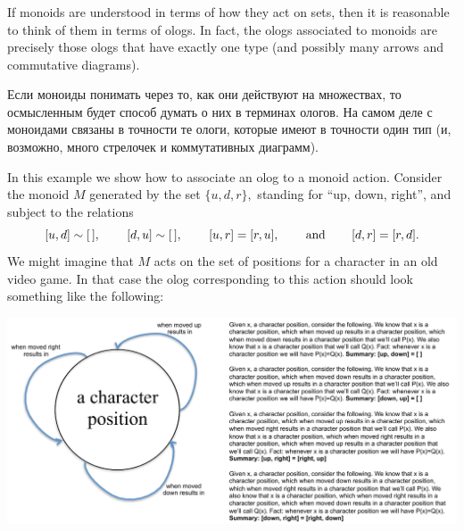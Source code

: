 \documentclass[../main/CT4S-EN-RU]{subfiles}
\begin{document}

\subsubsection{}

\begin{blockENG}
If monoids are understood in terms of how they act on sets, then it is reasonable to think of them in terms of ologs. In fact, the ologs associated to monoids are precisely those ologs that have exactly one type (and possibly many arrows and commutative diagrams).
\end{blockENG}

\begin{blockRUS}
Если моноиды понимать через то, как они действуют на множествах, то осмысленным будет способ думать о них в терминах ологов. На самом деле с моноидами связаны в точности те ологи, которые имеют в точности один тип (и, возможно, много стрелочек и коммутативных диаграмм).
\end{blockRUS}

\begin{exampleENG}\label{ex:monoid as olog}
In this example we show how to associate an olog to a monoid action. Consider the monoid $M$ generated by the set $\{u,d,r\},$ standing for “up, down, right”, and subject to the relations $$[u,d]\sim[\,],\hspace{.3in}[d,u]\sim[\,],\hspace{.3in}[u,r]=[r,u],\hspace{.3in} \textnormal{and}\hspace{.3in} [d,r]=[r,d].$$
We might imagine that $M$ acts on the set of positions for a character in an old video game. In that case the olog corresponding to this action should look something like the following:
\begin{center}
\includegraphics[width=\textwidth]{monoidOlog}
\end{center}
\end{exampleENG}
\end{document}
